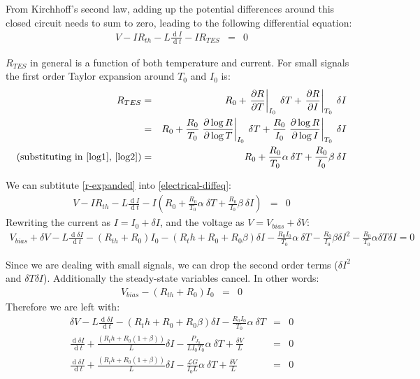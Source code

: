 \documentclass[letterpaper,10pt]{article}
\begin{document}
From Kirchhoff's second law, adding up the potential differences around this closed circuit needs to sum to zero, leading to the following differential equation:
\begin{eqnarray}
	V - I R_{th} - L \frac{\operatorname{d} I}{\operatorname{d} t} - I R_{TES} &=& 0 \label{electrical-diffeq}
\end{eqnarray}

$R_{TES}$ in general is a function of both temperature and current. For small signals the first order Taylor expansion around $T_0$ and $I_0$ is:
\begin{eqnarray}
	R_{TES} &=& R_0 + \left.\frac{\partial R}{\partial T}\right|_{I_0} \: \delta T + \left.\frac{\partial R}{\partial I}\right|_{T_0} \: \delta I \\
	&=& R_0 + \frac{R_0}{T_0}\left.\frac{\partial \log R}{\partial \log T}\right|_{I_0} \: \delta T + \frac{R_0}{I_0}\left.\frac{\partial \log R}{\partial \log I}\right|_{T_0} \: \delta I \\
	\mbox{(substituting in \eqref{log1}, \eqref{log2})}&=& R_0 + \frac{R_0}{T_0}\alpha \: \delta T + \frac{R_0}{I_0}\beta \: \delta I \label{r-expanded}
\end{eqnarray}

We can subtitute \eqref{r-expanded} into \eqref{electrical-diffeq}:
\begin{eqnarray}
	V - I R_{th} - L \frac{\operatorname{d} I}{\operatorname{d} t} - I \left(R_0 + \frac{R_0}{T_0}\alpha \: \delta T + \frac{R_0}{I_0}\beta \: \delta I\right) &=& 0
\end{eqnarray}
Rewriting the current as $I = I_0 + \delta I$, and the voltage as $V = V_{bias} + \delta V$:
\begin{eqnarray}
	V_{bias} + \delta V - L \frac{\operatorname{d} \delta I}{\operatorname{d} t} - ( R_{th} + R_0 ) I_0 - \left(R_th + R_0 + R_0 \beta \right) \delta I - \frac{R_0 I_0}{T_0}\alpha \: \delta T - \frac{R_0}{I_0}\beta  {\delta I}^2 - \frac{R_0}{T_0}\alpha {\delta T}{\delta I} = 0
\end{eqnarray}

Since we are dealing with small signals, we can drop the second order terms (${\delta I}^2$ and ${\delta T}{\delta I}$). Additionally the steady-state variables cancel. In other words:
\begin{eqnarray}
	V_{bias} - ( R_{th} + R_0 ) I_0 &=& 0
\end{eqnarray}
Therefore we are left with:
\begin{eqnarray}
	\delta V - L \frac{\operatorname{d} \delta I}{\operatorname{d} t} - \left(R_th + R_0 + R_0 \beta \right) \delta I - \frac{R_0 I_0}{T_0}\alpha \: \delta T &=& 0 \\
	\frac{\operatorname{d} \delta I}{\operatorname{d}t} + \frac{\left(R_th + R_0 ( 1 + \beta ) \right)}{L} \delta I - \frac{P_{J_0}}{L I_0 T_0}\alpha \: \delta T + \frac{\delta V}{L}&=& 0 \\
	\frac{\operatorname{d} \delta I}{\operatorname{d}t} + \frac{\left(R_th + R_0 ( 1 + \beta ) \right)}{L} \delta I - \frac{\mathcal{L} G}{I_0 L}\alpha \: \delta T + \frac{\delta V}{L}&=& 0
\end{eqnarray}
\end{document}
